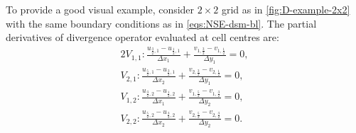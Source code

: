 \documentclass{article}
\numberwithin{equation}{section}
\begin{document}
To provide a good visual example, consider $2 \times 2$ grid as in \cref{fig:D-example-2x2} with the same boundary conditions as in \cref{eqs:NSE-dsm-bl}. The partial derivatives of divergence operator evaluated at cell centres are: 
\begin{alignat*}{2}
	V_{1,1}:\frac{u_{\frac{3}{2},1} - u_{\frac{1}{2},1}}{\Delta x_1}+\frac{v_{1,\frac{3}{2}} - v_{1,\frac{1}{2}}}{\Delta y_1}=0,\\
	V_{2,1}: \frac{u_{\frac{5}{2},1} - u_{\frac{3}{2},1}}{\Delta x_2}+\frac{v_{2,\frac{3}{2}} - v_{2,\frac{1}{2}}}{\Delta y_1}=0,\\
	V_{1,2}:\frac{u_{\frac{3}{2},2} - u_{\frac{1}{2},2}}{\Delta x_1}+\frac{v_{1,\frac{5}{2}} - v_{1,\frac{3}{2}}}{\Delta y_2}=0,\\
	V_{2,2}:\frac{u_{\frac{5}{2},2} - u_{\frac{3}{2},2}}{\Delta x_2}+\frac{v_{2,\frac{5}{2}} - v_{2,\frac{3}{2}}}{\Delta y_2}=0.
\end{alignat*}

\end{document}
